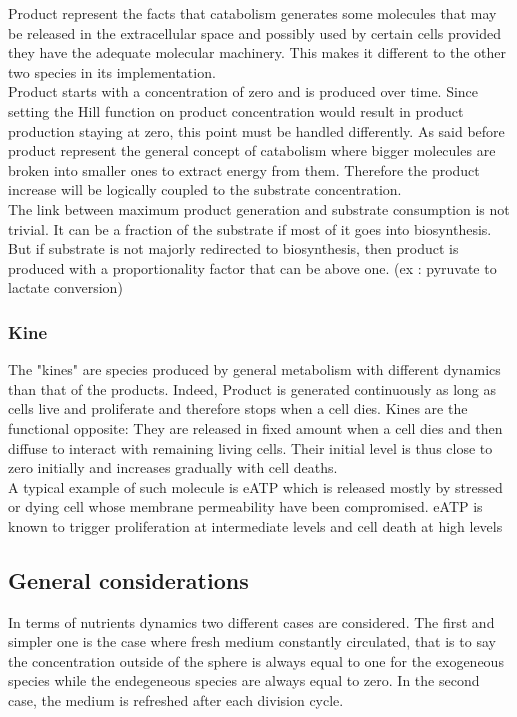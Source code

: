 \documentclass[11pt,a4paper]{article}
\begin{document}
Product represent the facts that catabolism generates some molecules that may be released in the extracellular space and possibly used by certain cells provided they have the adequate molecular machinery. This makes it different to the other two species in its implementation.\\

Product starts with a concentration of zero and is produced over time. Since setting the Hill function on product concentration would result in product production staying at zero, this point must be handled differently. As said before product represent the general concept of catabolism where bigger molecules are broken into smaller ones to extract energy from them. Therefore the product increase will be logically coupled to the substrate concentration.\\

The link between maximum product generation and substrate consumption is not trivial. It can be a fraction of the substrate if most of it goes into biosynthesis. But if substrate is not majorly redirected to biosynthesis, then product is produced with a proportionality factor that can be above one. (ex : pyruvate to lactate conversion)\\

\subsubsection{Kine}
The "kines" are species produced by general metabolism with  different dynamics than that of the products. Indeed, Product is generated continuously as long as cells live and proliferate and therefore stops when a cell dies. Kines are the functional opposite: They are released in fixed amount when a cell dies and then diffuse to interact with remaining living cells. Their initial level is thus close to zero initially and increases gradually with cell deaths. \\  

A typical example of such molecule is eATP which is released mostly by stressed or dying cell whose membrane permeability have been compromised. eATP is known to trigger proliferation at intermediate levels and cell death at high levels \cite{Vultaggio2020}\\

\subsection{General considerations}
In terms of nutrients dynamics two different cases are considered. The first and simpler one is the case where fresh medium constantly circulated, that is to say the concentration outside of the sphere is always equal to one for the exogeneous species while the endegeneous species are always equal to zero. In the second case, the medium is refreshed after each division cycle.\\
\end{document}

